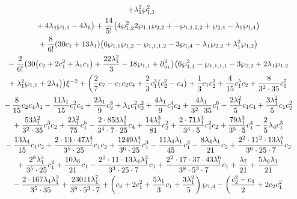 \documentclass[pdftex]{sigma}
\numberwithin{equation}{section}
\begin{document}
\begin{gather*}
 + \lambda_1^2 \wp_{1,1}^2\\
\hphantom{0=}{}
+ 4 \lambda_4 \wp_{1,1} - 4\lambda_6 \big) + \frac{14}{5!}\big(4\wp_{1,2}^2 2\wp_{1,1}\wp_{2,2} + -\wp_{1,1,2,2} + \wp_{2,4} - \lambda_1 \wp_{1,4}\big) \\
\hphantom{0=}{}
 + \frac{8}{6!} (30 c_1 + 13\lambda_1) \big(6 \wp_{1,1}\wp_{1,2} - \wp_{1,1,1,2} - 3 \wp_{1,4}
 - \lambda_1 \wp_{2,2} + \lambda_1^2 \wp_{1,2} \big)\\
\hphantom{0=}{}
 - \frac{2}{6!} \big(30\big(c_2+2c_1^2 + \lambda_1 c_1\big) + \frac{22 \lambda_1^2}{3} - 18 \wp_{1,1} + \partial_{u_1}^2\big)
 \big(6 \wp_{1,1}^2 - \wp_{1,1,1,1} - 3\wp_{2,2} + 2 \lambda_1 \wp_{1,2}\\
\hphantom{0=}{} + \lambda_1^2 \wp_{1,1} + 2\lambda_4\big) \big) \xi^{-2} +
 \left( \frac{2}{7} c_7 - c_1 c_2 c_4
 + \frac{2}{3} c_1^3 \big(c_2^2- c_4\big) + \frac{1}{3}c_1 c_2^3 + \frac{4}{15} c_1^5 c_2 + \frac{8}{3^2\cdot 35} c_1^7 \right.\\
\hphantom{0=}{} - \frac{8}{15} c_2 c_4 \lambda_1 - \frac{11\lambda_1}{15} c_1^2 c_4 + \frac{2\lambda_1}{9} c_2^3 + \lambda_1 c_1^2 c_2^2 + \frac{4 \lambda_1}{9} c_1^4 c_2
 + \frac{4 \lambda_1}{3^2 \cdot 35} c_1^6 - \frac{2\lambda_1^2}{5} c_1 c_4 + \frac{3\lambda_1^2}{5} c_1 c_2^2 \\
\hphantom{0=}{} + \frac{53\lambda_1^2}{3^2 \cdot 35} c_1^3 c_2 + \frac{2 \lambda_1^2}{75} c_1^5 - \frac{2\cdot 853\lambda_1^3}{3^4 \cdot 7 \cdot 25} c_4 + \frac{14 \lambda_1^3}{81} c_2^2 + \frac{2 \cdot 71 \lambda _1^3}{3^4 \cdot 5} c_1^2 c_2 + \frac{79 \lambda_1^3}{3^5 \cdot 5} c_1^4 - \frac{2}{5}\lambda_4 c_1^3 \\
\hphantom{0=}{}
- \frac{13 \lambda_4}{15} c_1 c_2 + \frac{2 \cdot 13 \cdot 47 \lambda_1^4}{3^5 \cdot 25} c_1 c_2 + \frac{1249 \lambda_1^4}{3^6 \cdot 25} c_1^3
 - \frac{11 \lambda _4 \lambda _1}{45} c_1^2 - \frac{8 \lambda_4 \lambda_1}{21} c_2
 + \frac{2^2 \cdot 11^2 \cdot 13 \lambda_1^5}{3^6 \cdot 25 \cdot 7} c_2\\
\hphantom{0=}{}
 + \frac{2^8 \lambda _1^5}{3^5 \cdot 25} c_1^2
 + \frac{10 \lambda_6}{21} c_1
 - \frac{2^2 \cdot 11 \cdot 13 \lambda_4 \lambda_1^2}{3^3 \cdot 25 \cdot 7} c_1 + \frac{2^2 \cdot 17 \cdot 37 \cdot 43 \lambda _1^6}{3^8 \cdot 5^3 \cdot 7} c_1 + \frac{\lambda _7}{21}
 + \frac{5 \lambda_6 \lambda_1}{21}\\
\hphantom{0=}{}
 - \frac{2\cdot 167 \lambda_4 \lambda_1^3}{3^5 \cdot 35}
 + \frac{23011 \lambda_1^7}{3^8 \cdot 5^3 \cdot 7} + \left(c_2 + 2c_1^2 + \frac{5 \lambda_1}{3} c_1
 + \frac{3 \lambda_1^2}{5} \right) \wp_{1,4} - \left(\frac{c_2^2-c_4}{2} + 2 c_2 c_1^2\right.\\

\end{gather*}
\end{document}
